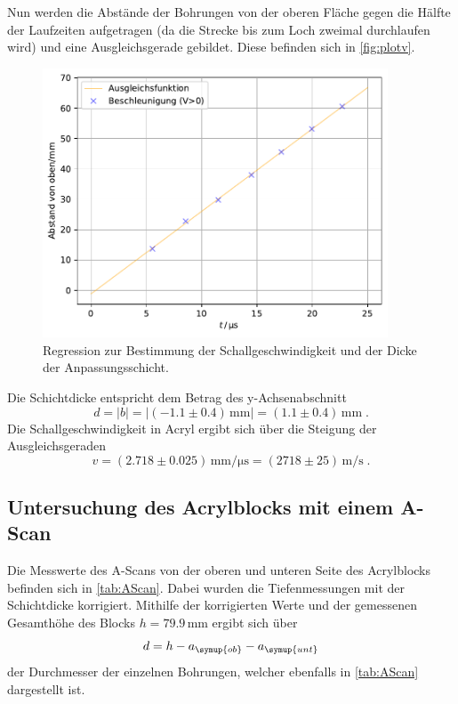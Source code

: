 Nun werden die Abstände der Bohrungen von der oberen Fläche gegen die Hälfte der Laufzeiten aufgetragen (da die Strecke bis zum Loch zweimal 
durchlaufen wird) und eine Ausgleichsgerade gebildet. Diese befinden sich in \autoref{fig:plotv}.
\begin{figure}
    \centering
    \includegraphics[height = 8cm]{build/plotv.pdf}
    \caption{Regression zur Bestimmung der Schallgeschwindigkeit und der Dicke der Anpassungsschicht.}
    \label{fig:plotv}
\end{figure}

Die Schichtdicke entspricht dem Betrag des y-Achsenabschnitt
\begin{equation*}
    d = \lvert b\rvert = \lvert (-1.1 \pm 0.4) \, \unit{\mm}\rvert =  (1.1 \pm 0.4) \, \unit{\mm} \; .
\end{equation*}
Die Schallgeschwindigkeit in Acryl ergibt sich über die Steigung der Ausgleichsgeraden
\begin{equation*}
    v = (2.718 \pm 0.025) \, \unit{\mm \per \micro\s} = (2718\pm 25) \, \unit{\m\per\s} \; .
\end{equation*}

\subsection{Untersuchung des Acrylblocks mit einem A-Scan}
Die Messwerte des A-Scans von der oberen und unteren Seite des Acrylblocks befinden sich in \autoref{tab:AScan}. Dabei wurden die Tiefenmessungen 
mit der Schichtdicke korrigiert. Mithilfe der korrigierten Werte und der gemessenen Gesamthöhe des Blocks $h = 79.9\,\unit{\mm}$ ergibt sich über 
\begin{equation*}
    d = h - a_{\symup{ob}} - a_{\symup{unt}}
\end{equation*}
der Durchmesser der einzelnen Bohrungen, welcher ebenfalls in \autoref{tab:AScan} dargestellt ist.

